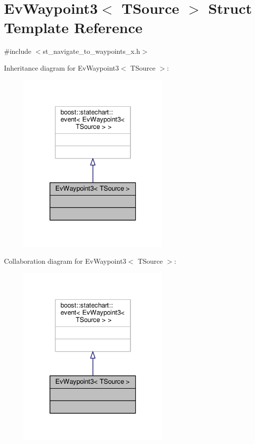\hypertarget{structEvWaypoint3}{}\section{Ev\+Waypoint3$<$ T\+Source $>$ Struct Template Reference}
\label{structEvWaypoint3}


{\ttfamily \#include $<$st\+\_\+navigate\+\_\+to\+\_\+waypoints\+\_\+x.\+h$>$}



Inheritance diagram for Ev\+Waypoint3$<$ T\+Source $>$\+:
\nopagebreak
\begin{figure}[H]
\begin{center}
\leavevmode
\includegraphics[width=210pt]{structEvWaypoint3__inherit__graph}
\end{center}
\end{figure}


Collaboration diagram for Ev\+Waypoint3$<$ T\+Source $>$\+:
\nopagebreak
\begin{figure}[H]
\begin{center}
\leavevmode
\includegraphics[width=210pt]{structEvWaypoint3__coll__graph}
\end{center}
\end{figure}


